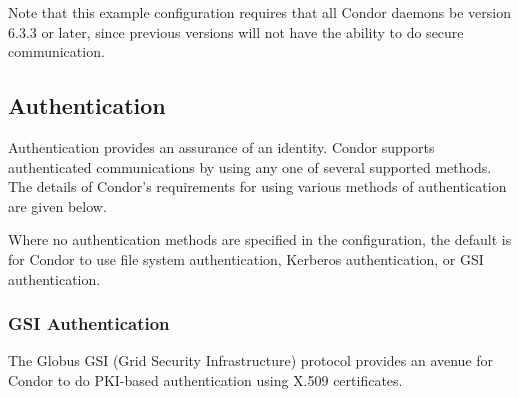 Note that this example configuration requires that all Condor daemons be
version 6.3.3 or later, since previous versions will not have
the ability to do secure communication.

\subsection{\label{sec:Authentication}Authentication}
Authentication provides an assurance of an identity.
Condor supports authenticated communications by using any one
of several supported methods.
The details of Condor's requirements for using various methods
of authentication are given below.

Where no authentication methods are specified in the configuration,
the default is for Condor to use file system authentication,
Kerberos authentication, or GSI authentication.

\subsubsection{\label{sec:GSI-Authentication}GSI Authentication}
The Globus GSI (Grid Security Infrastructure) protocol provides
an avenue for Condor to do
PKI-based authentication using X.509 certificates.

